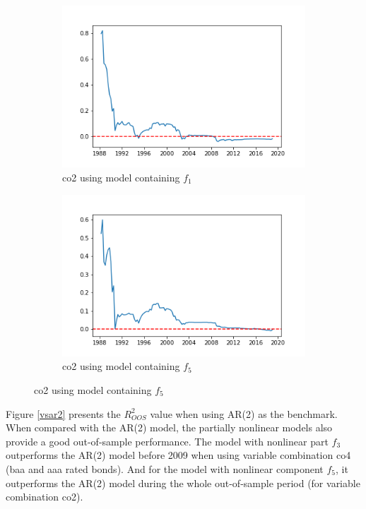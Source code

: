 \documentclass[a4paper,12pt,times,numbered,print,index]{report}
\numberwithin{equation}{section}
\begin{document}
\begin{figure}[!htbp]
	\centering
	\caption{OOS Performance (Benchmark: AR(1) Model)}
	\begin{subfigure}[b]{0.42\linewidth}
		\includegraphics[width=1.2\linewidth]{plots/co2_AR1_g1.png}
		\caption{co2 using model containing $f_1$}
	\end{subfigure}
	\begin{subfigure}[b]{0.42\linewidth}
		\includegraphics[width=1.2\linewidth]{plots/co2_AR1_g5.png}
		\caption{co2 using model containing $f_5$}
	\end{subfigure}
	\label{vsar1}
\end{figure}

Figure \ref{vsar2} presents the $R^2_{OOS}$ value when using AR(2) as the benchmark.
When compared with the AR(2) model, the partially nonlinear models also provide a good out-of-sample performance. The model with nonlinear part $f_3$ outperforms the AR(2) model before 2009 when using variable combination co4 (baa and aaa rated bonds). And for the model with nonlinear component $f_5$, it outperforms the AR(2) model during the whole out-of-sample period (for variable combination co2). 
\end{document}
